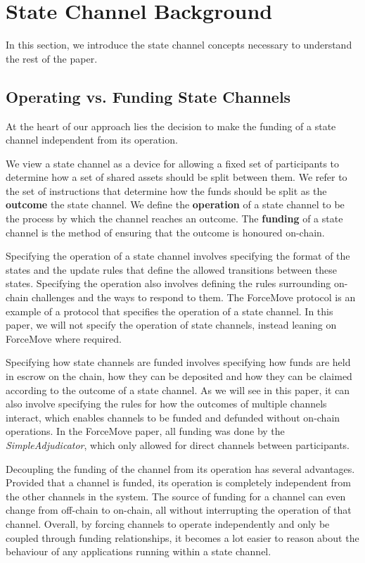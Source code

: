 \documentclass{article}
\begin{document}
\section{State Channel Background}

In this section, we introduce the state channel concepts necessary to understand the rest of the paper.

\subsection{Operating vs. Funding State Channels}

At the heart of our approach lies the decision to make the funding of a state channel independent from its operation.

We view a state channel as a device for allowing a fixed set of participants to determine how a set of shared assets should be split between them.
We refer to the set of instructions that determine how the funds should be split as the  \textbf{outcome} the state channel.
We define the \textbf{operation} of a state channel to be the process by which the channel reaches an outcome. 
The \textbf{funding} of a state channel is the method of ensuring that the outcome is honoured on-chain.

Specifying the operation of a state channel involves specifying the format of the states and the update rules that define the allowed transitions between these states.
Specifying the operation also involves defining the rules surrounding on-chain challenges and the ways to respond to them.
The ForceMove protocol is an example of a protocol that specifies the operation of a state channel.
In this paper, we will not specify the operation of state channels, instead leaning on ForceMove where required.

Specifying how state channels are funded involves specifying how funds are held in escrow on the chain, how they can be deposited and how they can be claimed according to the outcome of a state channel.
As we will see in this paper, it can also involve specifying the rules for how the outcomes of multiple channels interact, which enables channels to be funded and defunded without on-chain operations.
In the ForceMove paper, all funding was done by the \textit{SimpleAdjudicator}, which only allowed for direct channels between participants.

Decoupling the funding of the channel from its operation has several advantages.
Provided that a channel is funded, its operation is completely independent from the other channels in the system.
The source of funding for a channel can even change from off-chain to on-chain, all without interrupting the operation of that channel.
Overall, by forcing channels to operate independently and only be coupled through funding relationships, it becomes a lot easier to reason about the behaviour of any applications running within a state channel.
\end{document}
